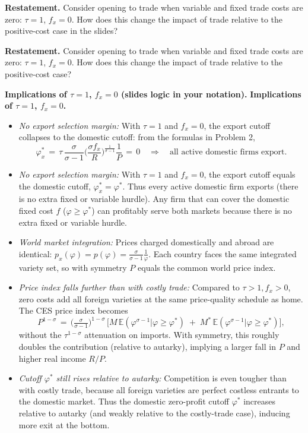 \begin{solution}
	\textbf{Restatement.} Consider opening to trade when variable and fixed trade costs are zero: $\tau=1$, $f_x=0$. How does this change the impact of trade relative to the positive-cost case in the slides?
\begin{solution}
    	\textbf{Restatement.} Consider opening to trade when variable and fixed trade costs are zero: $\tau=1$, $f_x=0$. How does this change the impact of trade relative to the positive-cost case?

\bigskip
	\textbf{Implications of $\tau=1$, $f_x=0$ (slides logic in your notation).}
		\textbf{Implications of $\tau=1$, $f_x=0$.}
\begin{itemize}
	\item \emph{No export selection margin:} With $\tau=1$ and $f_x=0$, the export cutoff collapses to the domestic cutoff: from the formulas in Problem 2,
	\[
		\varphi_x^* \,=\, \tau\, \frac{\sigma}{\sigma-1}\Big(\frac{\sigma f_x}{R}\Big)^{\!\tfrac{1}{\sigma-1}} \frac{1}{P} \,=\, 0 \quad \Rightarrow \quad \text{all active domestic firms export.}
	\]
	\item \emph{No export selection margin:} With $\tau=1$ and $f_x=0$, the export cutoff equals the domestic cutoff, $\varphi_x^*=\varphi^*$. Thus every active domestic firm exports (there is no extra fixed or variable hurdle).
	Any firm that can cover the domestic fixed cost $f$ ($\varphi\ge \varphi^*$) can profitably serve both markets because there is no extra fixed or variable hurdle.
	\item \emph{World market integration:} Prices charged domestically and abroad are identical: $p_x(\varphi)=p(\varphi)=\tfrac{\sigma}{\sigma-1}\tfrac{1}{\varphi}$. Each country faces the same integrated variety set, so with symmetry $P$ equals the common world price index.
	\item \emph{Price index falls further than with costly trade:} Compared to $\tau>1, f_x>0$, zero costs add all foreign varieties at the same price-quality schedule as home. The CES price index becomes
	\[
		P^{1-\sigma} \,=\, \Big(\tfrac{\sigma}{\sigma-1}\Big)^{1-\sigma}\,\Big[ M\, \mathbb{E}(\varphi^{\sigma-1}|\varphi\ge \varphi^*) \; + \; M^*\, \mathbb{E}(\varphi^{\sigma-1}|\varphi\ge \varphi^*) \Big],
	\]
	without the $\tau^{1-\sigma}$ attenuation on imports. With symmetry, this roughly doubles the contribution (relative to autarky), implying a larger fall in $P$ and higher real income $R/P$.
	\item \emph{Cutoff $\varphi^*$ still rises relative to autarky:} Competition is even tougher than with costly trade, because all foreign varieties are perfect costless entrants to the domestic market. Thus the domestic zero-profit cutoff $\varphi^*$ increases relative to autarky (and weakly relative to the costly-trade case), inducing more exit at the bottom.

\end{itemize}
\end{solution}
\end{solution}
